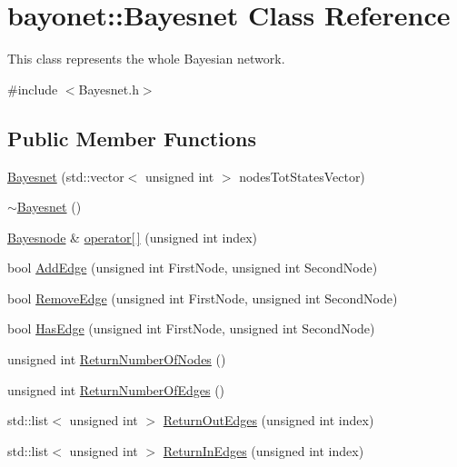 \hypertarget{classbayonet_1_1_bayesnet}{\section{bayonet\-:\-:Bayesnet Class Reference}
\label{classbayonet_1_1_bayesnet}
}


This class represents the whole Bayesian network.  




{\ttfamily \#include $<$Bayesnet.\-h$>$}

\subsection*{Public Member Functions}
\begin{DoxyCompactItemize}
\item 
\hyperlink{classbayonet_1_1_bayesnet_a27bc4870f26d4bd00953d7589c2d4abd}{Bayesnet} (std\-::vector$<$ unsigned int $>$ nodes\-Tot\-States\-Vector)
\item 
\hyperlink{classbayonet_1_1_bayesnet_af0d3ee29b0676789a3c5d1c33a0e36a2}{$\sim$\-Bayesnet} ()
\item 
\hyperlink{classbayonet_1_1_bayesnode}{Bayesnode} \& \hyperlink{classbayonet_1_1_bayesnet_ac2367ab8e0fdae128f17159f09c63eea}{operator\mbox{[}$\,$\mbox{]}} (unsigned int index)
\item 
bool \hyperlink{classbayonet_1_1_bayesnet_aba354bf67d39dc73e070e63b9bc45ecd}{Add\-Edge} (unsigned int First\-Node, unsigned int Second\-Node)
\item 
bool \hyperlink{classbayonet_1_1_bayesnet_a0ea810411a987ebeb97b580053ce7c7f}{Remove\-Edge} (unsigned int First\-Node, unsigned int Second\-Node)
\item 
bool \hyperlink{classbayonet_1_1_bayesnet_ae852714069b47eff14918d5a4e53a2dd}{Has\-Edge} (unsigned int First\-Node, unsigned int Second\-Node)
\item 
unsigned int \hyperlink{classbayonet_1_1_bayesnet_a2d68782e4d08abf2bb2f0ad093db78cc}{Return\-Number\-Of\-Nodes} ()
\item 
unsigned int \hyperlink{classbayonet_1_1_bayesnet_a42e6612c84beb2d4e6d5c55792f3ed4e}{Return\-Number\-Of\-Edges} ()
\item 
std\-::list$<$ unsigned int $>$ \hyperlink{classbayonet_1_1_bayesnet_acb33076271f03ba59ac98a04b762d26b}{Return\-Out\-Edges} (unsigned int index)
\item 
std\-::list$<$ unsigned int $>$ \hyperlink{classbayonet_1_1_bayesnet_a5621b949d8fda17ae0efd9810655b1b3}{Return\-In\-Edges} (unsigned int index)

\end{DoxyCompactItemize}
